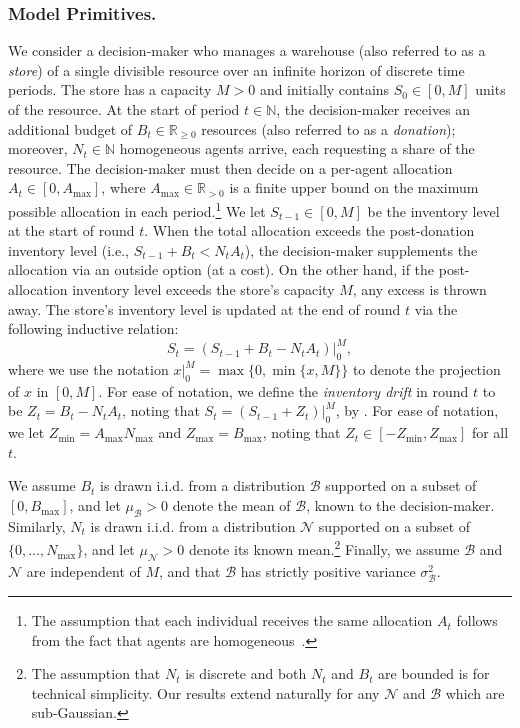 \documentclass[mnsc,nonblindrev]{informs3}
\newcommand{\N}{\mathbb{N}}
\newcommand{\R}{\mathbb{R}}
\newcommand{\NDist}{\mathcal{N}}
\newcommand{\BDist}{\mathcal{B}}
\newcommand{\Nmean}{\mu_{\NDist}}
\newcommand{\Bmean}{\mu_{\BDist}}
\newcommand{\Bstd}{\sigma_{\BDist}}
\newcommand{\maxAlloc}{A_{\max}}
\newcommand{\Nmax}{N_{\max}}
\newcommand{\Bmax}{B_{\max}}
\renewcommand{\paragraph}[1]{\subsubsection*{#1}}
\begin{document}
\paragraph{Model Primitives.} We consider a decision-maker who manages a warehouse (also referred to as a {\em store}) of a single divisible resource over an infinite horizon of discrete time periods.  The store has a capacity $M > 0$ and initially contains $S_0 \in [0,M]$ units of the resource. At the start of period $t \in \N$, the decision-maker receives an additional budget of $B_t \in \R_{\geq 0}$ resources (also referred to as a {\em donation}); moreover, $N_t\in \N$ homogeneous agents arrive, each requesting a share of the resource.
The decision-maker must then decide on a per-agent allocation $A_t \in [0,\maxAlloc]$, where $\maxAlloc \in \mathbb{R}_{> 0}$ is a finite upper bound on the maximum possible allocation in each period.\footnote{The assumption that each individual receives the same allocation $A_t$ follows from the fact that agents are homogeneous~\citep{varian1973equity}.} We let $S_{t-1} \in [0,M]$ be the inventory level at the start of round $t$. When the total allocation exceeds the post-donation inventory level (i.e., $S_{t-1}+B_t < N_tA_t$), the decision-maker supplements the allocation via an outside option (at a cost). On the other hand, if the post-allocation inventory level exceeds the store's capacity $M$, any excess is thrown away. The store's inventory level is updated at the end of round $t$ via the following inductive relation: 
\begin{equation}
\label{eq:state_dynamics}
S_{t} = (S_{t-1} + B_t - N_t A_t)\Big|_0^{M},
\end{equation}
where we use the notation $x|_0^{M} = \max\{0,\min\{x,M\}\}$ to denote the projection of $x$ in $[0,M]$. For ease of notation, we define the {\it inventory drift} in round $t$ to be $Z_t = B_t-N_tA_t$, noting that $S_{t} = \left.(S_{t-1} + Z_t)\right|_0^{M}$, by . For ease of notation, we let $Z_{\min} = \maxAlloc\Nmax$ and $Z_{\max} = \Bmax$, noting that $Z_t \in [-Z_{\min},Z_{\max}]$ for all $t$.


We assume $B_t$ is drawn i.i.d. from a distribution $\BDist$ supported on a subset of $[0, B_{\max}]$, and let $\Bmean {> 0}$ denote the mean of $\BDist$, known to the decision-maker. Similarly, $N_t$ is drawn i.i.d. from a distribution $\NDist$ supported on a subset of $\{0,\ldots,N_{\max}\}$, and let $\Nmean {> 0}$ denote its known mean.\footnote{The assumption that $N_t$ is discrete and both $N_t$ and $B_t$ are bounded is for technical simplicity. Our results extend naturally for any $\NDist$ and $\BDist$ which are sub-Gaussian.} Finally, we assume $\BDist$ and $\NDist$ are independent of $M$, and that $\BDist$ has strictly positive variance $\Bstd^2$.
\end{document}
